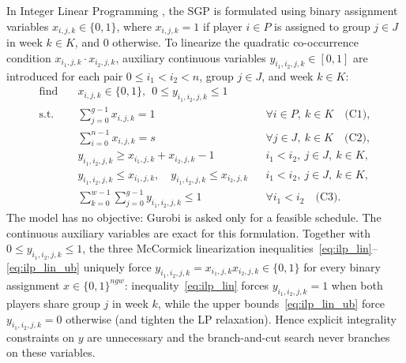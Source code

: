 \documentclass[a4paper,fleqn]{cas-sc}
\begin{document}
In Integer Linear Programming \cite{gurobi}, the SGP is formulated using binary assignment variables $x_{i,j,k} \in \{0, 1\}$, where $x_{i,j,k} = 1$ if player $i \in P$ is assigned to group $j \in J$ in week $k \in K$, and $0$ otherwise. To linearize the quadratic co-occurrence condition $x_{i_1,j,k} \cdot x_{i_2,j,k}$, auxiliary continuous variables $y_{i_1,i_2,j,k} \in [0, 1]$ are introduced for each pair $0 \le i_1 < i_2 < n$, group $j \in J$, and week $k \in K$:
\begin{align}
    \text{find} \quad & x_{i,j,k} \in \{0, 1\},\ \ 0 \le y_{i_1,i_2,j,k} \le 1 \label{eq:ilp_vars} \\
    \text{s.t.} \quad & \sum_{j=0}^{g-1} x_{i,j,k} = 1 && \forall i \in P,\ k \in K \quad \text{(C1)}, \label{eq:ilp_c1} \\
                      & \sum_{i=0}^{n-1} x_{i,j,k} = s && \forall j \in J,\ k \in K \quad \text{(C2)}, \label{eq:ilp_c2} \\
                      & y_{i_1,i_2,j,k} \ge x_{i_1,j,k} + x_{i_2,j,k} - 1
                          && i_1<i_2,\ j \in J,\ k \in K, \label{eq:ilp_lin}\\
                      & y_{i_1,i_2,j,k} \le x_{i_1,j,k},\quad y_{i_1,i_2,j,k} \le x_{i_2,j,k}
                          && i_1<i_2,\ j \in J,\ k \in K, \label{eq:ilp_lin_ub}\\
                      & \sum_{k=0}^{w-1} \sum_{j=0}^{g-1} y_{i_1,i_2,j,k} \le 1 && \forall i_1 < i_2 \quad \text{(C3)}. \label{eq:ilp_c3}
\end{align}
The model has no objective: Gurobi is asked only for a feasible schedule. The continuous auxiliary variables are exact for this formulation. Together with $0 \le y_{i_1,i_2,j,k} \le 1$, the three McCormick linearization inequalities~\eqref{eq:ilp_lin}--\eqref{eq:ilp_lin_ub} uniquely force $y_{i_1,i_2,j,k} = x_{i_1,j,k} x_{i_2,j,k} \in \{0, 1\}$ for every binary assignment $x \in \{0, 1\}^{ngw}$: inequality~\eqref{eq:ilp_lin} forces $y_{i_1,i_2,j,k}=1$ when both players share group $j$ in week $k$, while the upper bounds~\eqref{eq:ilp_lin_ub} force $y_{i_1,i_2,j,k}=0$ otherwise (and tighten the LP relaxation). Hence explicit integrality constraints on $y$ are unnecessary and the branch-and-cut search never branches on these variables.
\end{document}
